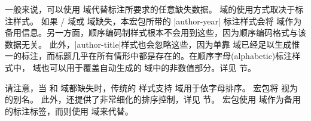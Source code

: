 
一般来说，可以使用  域代替标注所要求的任意缺失数据。 域的使用方式取决于标注样式。
如果 \slash {} 域或  域缺失，本宏包所带的 |author-year| 标注样式会将  域作为备用信息。另一方面，顺序编码制样式根本不会用到这些，因为顺序编码格式与该数据无关。
此外，|author-title|样式也会忽略这些，因为单靠  域已经足以生成惟一的标注，而标题几乎在所有情形中都是存在的。在顺序字母(alphabetic)标注样式中， 域也可以用于覆盖自动生成的  域中的非数值部分。详见  节。



请注意，当  和  域都缺失时，传统的 \BibTeX 样式支持  域用于依字母排序。
\biblatex 宏包将  视为  的别名。
此外，\biblatex 还提供了非常细化的排序控制，详见  节。
 宏包使用  域作为备用的标注标签，而\biblatex 则使用  域来代替。

